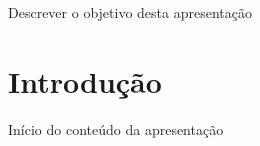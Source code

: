 \documentclass[aspectratio=169]{beamer} %
\begin{document}


{

{ \begin{frame}

\begin{flushright}
Descrever o objetivo desta apresentação

\end{flushright}


\end{frame} }





\section{Introdução}
{
\begin{frame}

\centering
Início do conteúdo da apresentação



\end{frame}}}
\end{document}
